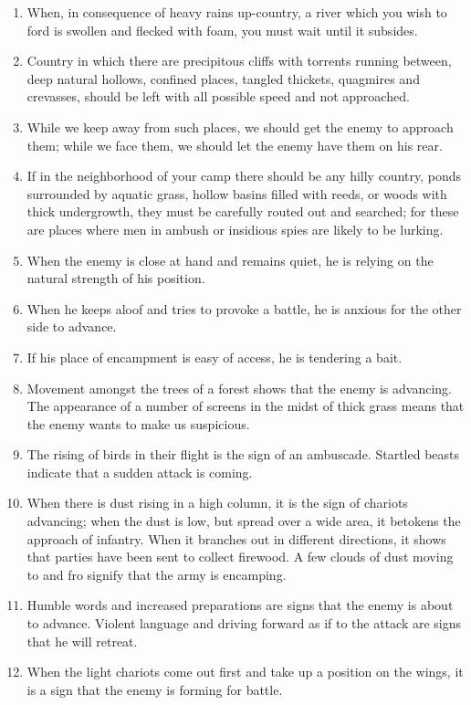 \documentclass[oneside]{book}
\begin{document}
\begin{enumerate}
	\item When, in consequence of heavy rains up-country, a river which you wish to ford is swollen and flecked with foam, you must wait until it subsides.
	\item Country in which there are precipitous cliffs with torrents running between, deep natural hollows, confined places, tangled thickets, quagmires and crevasses, should be left with all possible speed and not approached.
	\item While we keep away from such places, we should get the enemy to approach them; while we face them, we should let the enemy have them on his rear.
	\item If in the neighborhood of your camp there should be any hilly country, ponds surrounded by aquatic grass, hollow basins filled with reeds, or woods with thick undergrowth, they must be carefully routed out and searched; for these are places where men in ambush or insidious spies are likely to be lurking.
	\item When the enemy is close at hand and remains quiet, he is relying on the natural strength of his position.
	\item When he keeps aloof and tries to provoke a battle, he is anxious for the other side to advance.
	\item If his place of encampment is easy of access, he is tendering a bait.
	\item Movement amongst the trees of a forest shows that the enemy is advancing. The appearance of a number of screens in the midst of thick grass means that the enemy wants to make us suspicious.
	\item The rising of birds in their flight is the sign of an ambuscade. Startled beasts indicate that a sudden attack is coming.
	\item When there is dust rising in a high column, it is the sign of chariots advancing; when the dust is low, but spread over a wide area, it betokens the approach of infantry. When it branches out in different directions, it shows that parties have been sent to collect firewood. A few clouds of dust moving to and fro signify that the army is encamping.
	\item Humble words and increased preparations are signs that the enemy is about to advance. Violent language and driving forward as if to the attack are signs that he will retreat.
	\item When the light chariots come out first and take up a position on the wings, it is a sign that the enemy is forming for battle.

\end{enumerate}
\end{document}
